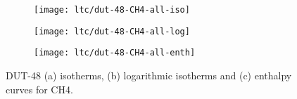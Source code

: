 \begin{figure}[htb]
    \centering
    \begin{subfigure}{0.33\linewidth}
        \texttt{[image: ltc/dut-48-CH4-all-iso]}%
        \caption{}
    \end{subfigure}%
    \begin{subfigure}{0.33\linewidth}
        \texttt{[image: ltc/dut-48-CH4-all-log]}%
        \caption{}
    \end{subfigure}%
    \begin{subfigure}{0.33\linewidth}
        \texttt{[image: ltc/dut-48-CH4-all-enth]}%
        \caption{}
    \end{subfigure}%
    \caption{DUT-48 (a) isotherms, (b) logarithmic isotherms and 
    (c) enthalpy curves for CH4.}%
    \label{appx:dut:fgr:dut-48-CH4-ltc}
\end{figure}

\pagebreak